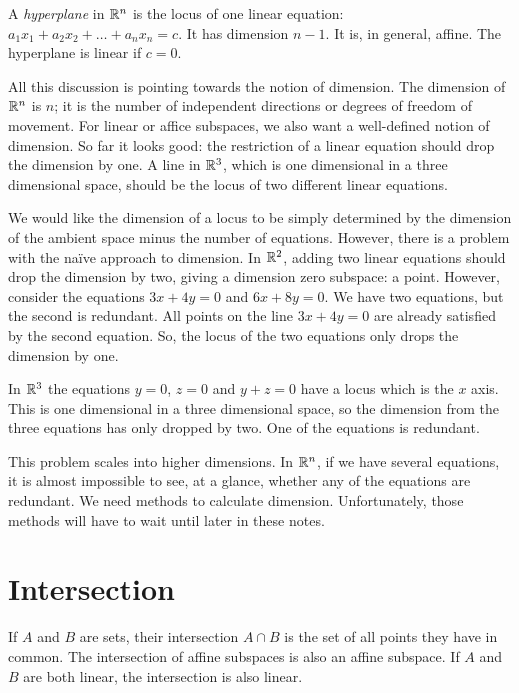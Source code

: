 \documentclass[fleqn]{report}
\begin{document}
\begin{defn}
A \emph{hyperplane} in $\mathbb{R}^n$ is the locus of one linear
equation: $a_1 x_1 + a_2 x_2 + \ldots + a_n x_n = c$. It has
dimension $n-1$. It is, in general, affine. The hyperplane is
linear if $c=0$. 
\end{defn}

All this discussion is pointing towards the notion of
dimension. The dimension of $\mathbb{R}^n$ is $n$; it is the number
of independent directions or degrees of freedom of movement.
For linear or affice subspaces, we also want a well-defined
notion of dimension. So far it looks good: the restriction of
a linear equation should drop the dimension by one. A
line in $\mathbb{R}^3$, which is one dimensional in a three
dimensional space, should be the locus of two different linear
equations.

We would like the dimension of a locus to be simply determined by
the dimension of the ambient space minus the number of
equations. However, there is a problem with the na\"ive approach
to dimension. In $\mathbb{R}^2$, adding two linear equations should
drop the dimension by two, giving a dimension zero subspace: a
point. However, consider the equations $3x + 4y = 0$ and $6x +
8y = 0$. We have two equations, but the second is redundant.
All points on the line $3x + 4y = 0$ are already satisfied by
the second equation. So, the locus of the two equations only
drops the dimension by one.

In $\mathbb{R}^3$ the equations $y=0$, $z=0$ and $y+z=0$ have a
locus which is the $x$ axis. This is one dimensional in a three
dimensional space, so the dimension from the three equations
has only dropped by two. One of the equations is redundant.

This problem scales into higher dimensions. In $\mathbb{R}^n$, if we
have several equations, it is almost impossible to see, at a
glance, whether any of the equations are redundant. We need
methods to calculate dimension. Unfortunately, those methods
will have to wait until later in these notes. 

\section{Intersection}

\begin{defn}
If $A$ and $B$ are sets, their intersection $A \cap B$
is the set of all points they have in common. The
intersection of affine subspaces is also an
affine subspace. If $A$ and $B$ are both linear, the intersection
is also linear.
\end{defn}
\end{document}
